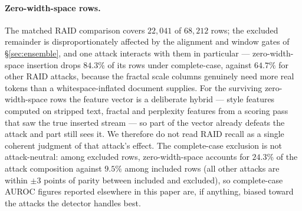 \documentclass{article}
\begin{document}
\paragraph{Zero-width-space rows.} The matched RAID comparison covers $22{,}041$ of
$68{,}212$ rows; the excluded remainder is disproportionately affected by the
alignment and window gates of \S\ref{sec:ensemble}, and one attack interacts with them
in particular --- zero-width-space insertion drops $84.3\%$ of its rows under
complete-case, against $64.7\%$ for other RAID attacks, because the fractal scale
columns genuinely need more real tokens than a whitespace-inflated document
supplies. For the surviving zero-width-space rows the feature vector is a deliberate
hybrid --- style features computed
on stripped text, fractal and perplexity features from a scoring pass that saw the
true inserted stream --- so part of the vector already defeats the attack and part
still sees it. We therefore do not read RAID recall as a single coherent judgment
of that attack's effect. The complete-case exclusion is not attack-neutral: among
excluded rows, zero-width-space accounts for $24.3\%$ of the attack composition
against $9.5\%$ among included rows (all other attacks are within $\pm3$ points
of parity between included and excluded), so complete-case AUROC figures reported
elsewhere in this paper are, if anything, biased toward the attacks the detector
handles best.
\end{document}
